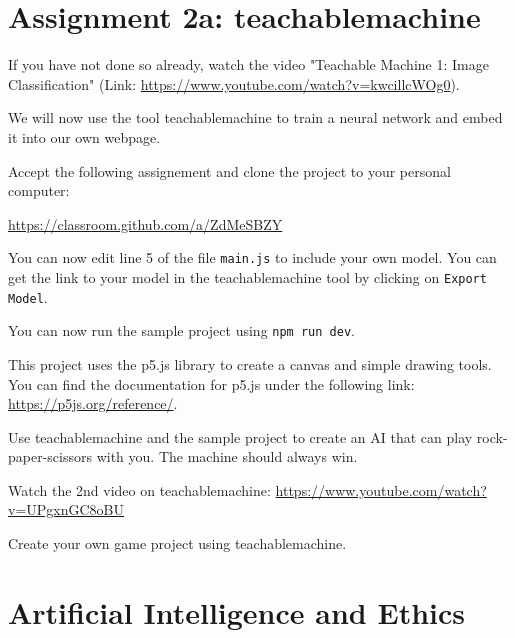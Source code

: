 \documentclass[12pt,a4paper]{report}
\begin{document}
\section*{Assignment 2a: teachablemachine}

\begin{ex}
    If you have not done so already, watch the video "Teachable Machine 1: Image Classification" (Link: \url{https://www.youtube.com/watch?v=kwcillcWOg0}).
\end{ex}

We will now use the tool teachablemachine to train a neural network and embed it into our own webpage.

\begin{ex}
    Accept the following assignement and clone the project to your personal computer:
    
    \url{https://classroom.github.com/a/ZdMeSBZY}

    You can now edit line 5 of the file \verb|main.js| to include your own model. You can get the link to your model in the teachablemachine tool by clicking on \verb|Export Model|.

   You can now run the sample project using \verb|npm run dev|.

   This project uses the p5.js library to create a canvas and simple drawing tools. You can find the documentation for p5.js under the following link: \url{https://p5js.org/reference/}.
\end{ex}

\begin{ex}
    Use teachablemachine and the sample project to create an AI that can play rock-paper-scissors with you. The machine should always win.
\end{ex}

\begin{ex}
     Watch the 2nd video on teachablemachine: \url{https://www.youtube.com/watch?v=UPgxnGC8oBU}
\end{ex}


\begin{ex}
     Create your own game project using teachablemachine.
\end{ex}



\section*{Artificial Intelligence and Ethics}
\end{document}
